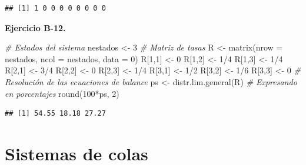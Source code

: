 \documentclass[
]{book}
\newenvironment{Shaded}{\begin{snugshade}}{\end{snugshade}}
\newcommand{\AttributeTok}[1]{\textcolor[rgb]{0.77,0.63,0.00}{#1}}
\newcommand{\CommentTok}[1]{\textcolor[rgb]{0.56,0.35,0.01}{\textit{#1}}}
\newcommand{\DecValTok}[1]{\textcolor[rgb]{0.00,0.00,0.81}{#1}}
\newcommand{\FunctionTok}[1]{\textcolor[rgb]{0.00,0.00,0.00}{#1}}
\newcommand{\NormalTok}[1]{#1}
\newcommand{\OtherTok}[1]{\textcolor[rgb]{0.56,0.35,0.01}{#1}}
\newcommand{\SpecialCharTok}[1]{\textcolor[rgb]{0.00,0.00,0.00}{#1}}
\theoremstyle{definition}
\theoremstyle{definition}
\theoremstyle{definition}
\theoremstyle{definition}
\theoremstyle{remark}
\begin{document}
\begin{verbatim}
## [1] 1 0 0 0 0 0 0 0 0
\end{verbatim}

\textbf{Ejercicio B-12.}

\begin{Shaded}
\begin{Highlighting}[]
\CommentTok{\# Estados del sistema}
\NormalTok{nestados }\OtherTok{\textless{}{-}} \DecValTok{3}
\CommentTok{\# Matriz de tasas}
\NormalTok{R }\OtherTok{\textless{}{-}} \FunctionTok{matrix}\NormalTok{(}\AttributeTok{nrow =}\NormalTok{ nestados, }\AttributeTok{ncol =}\NormalTok{ nestados, }\AttributeTok{data =} \DecValTok{0}\NormalTok{)}
\NormalTok{R[}\DecValTok{1}\NormalTok{,}\DecValTok{1}\NormalTok{] }\OtherTok{\textless{}{-}} \DecValTok{0} 
\NormalTok{R[}\DecValTok{1}\NormalTok{,}\DecValTok{2}\NormalTok{] }\OtherTok{\textless{}{-}} \DecValTok{1}\SpecialCharTok{/}\DecValTok{4}
\NormalTok{R[}\DecValTok{1}\NormalTok{,}\DecValTok{3}\NormalTok{] }\OtherTok{\textless{}{-}} \DecValTok{1}\SpecialCharTok{/}\DecValTok{4}
\NormalTok{R[}\DecValTok{2}\NormalTok{,}\DecValTok{1}\NormalTok{] }\OtherTok{\textless{}{-}} \DecValTok{3}\SpecialCharTok{/}\DecValTok{4}
\NormalTok{R[}\DecValTok{2}\NormalTok{,}\DecValTok{2}\NormalTok{] }\OtherTok{\textless{}{-}} \DecValTok{0}
\NormalTok{R[}\DecValTok{2}\NormalTok{,}\DecValTok{3}\NormalTok{] }\OtherTok{\textless{}{-}} \DecValTok{1}\SpecialCharTok{/}\DecValTok{4}
\NormalTok{R[}\DecValTok{3}\NormalTok{,}\DecValTok{1}\NormalTok{] }\OtherTok{\textless{}{-}} \DecValTok{1}\SpecialCharTok{/}\DecValTok{2}
\NormalTok{R[}\DecValTok{3}\NormalTok{,}\DecValTok{2}\NormalTok{] }\OtherTok{\textless{}{-}} \DecValTok{1}\SpecialCharTok{/}\DecValTok{6}
\NormalTok{R[}\DecValTok{3}\NormalTok{,}\DecValTok{3}\NormalTok{] }\OtherTok{\textless{}{-}} \DecValTok{0}
\CommentTok{\# Resolución  de las ecuaciones de balance}
\NormalTok{ps }\OtherTok{\textless{}{-}} \FunctionTok{distr.lim.general}\NormalTok{(R)}
\CommentTok{\# Expresando en porcentajes}
\FunctionTok{round}\NormalTok{(}\DecValTok{100}\SpecialCharTok{*}\NormalTok{ps, }\DecValTok{2}\NormalTok{)}
\end{Highlighting}
\end{Shaded}

\begin{verbatim}
## [1] 54.55 18.18 27.27
\end{verbatim}

\hypertarget{COLAS}{%
\chapter{Sistemas de colas}\label{COLAS}}
\end{document}
